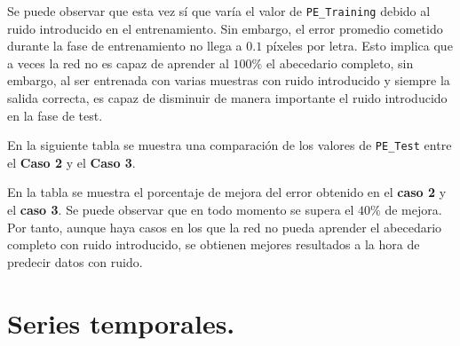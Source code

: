 \documentclass[spanish]{assignment}
\begin{document}
	Se puede observar que esta vez sí que varía el valor de \texttt{PE\_Training} debido al ruido introducido en el entrenamiento. Sin embargo, el error promedio cometido durante la fase de entrenamiento no llega a $0.1$ píxeles por letra. Esto implica que a veces la red no es capaz de aprender al $100\%$ el abecedario completo, sin embargo, al ser entrenada con varias muestras con ruido introducido y siempre la salida correcta, es capaz de disminuir de manera importante el ruido introducido en la fase de test.
	
	En la siguiente tabla se muestra una comparación de los valores de \texttt{PE\_Test} entre el \textbf{Caso 2} y el \textbf{Caso 3}.
	
	\vspace{5mm}
	\noindent{}
	\vspace{5mm}
	
	En la tabla se muestra el porcentaje de mejora del error obtenido en el \textbf{caso 2} y el \textbf{caso 3}. Se puede observar que en todo momento se supera el $40\%$ de mejora. Por tanto, aunque haya casos en los que la red no pueda aprender el abecedario completo con ruido introducido, se obtienen mejores resultados a la hora de predecir datos con ruido.
		
	\newpage
	\section{Series temporales.}
\end{document}
